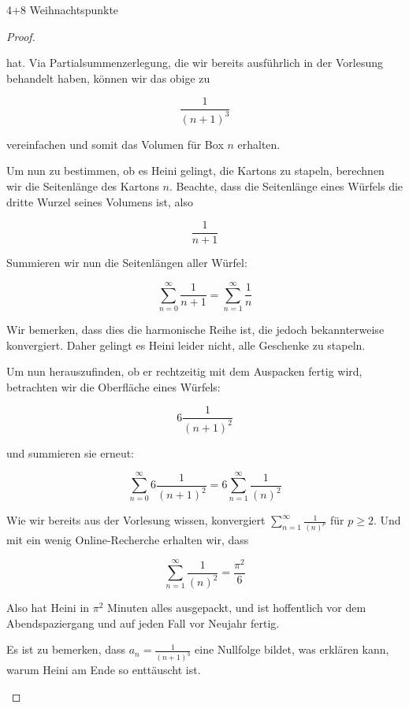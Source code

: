 \documentclass{problemset}
\begin{document}
\begin{problem}[Weihnachtsaufgaben*]{4+8 Weihnachtspunkte}
\begin{proof}
\begin{enumerate}
              hat. Via Partialsummenzerlegung, die wir bereits ausführlich in der Vorlesung
              behandelt haben, können wir das obige zu

              \[
                  \frac{1}{{(n+1)}^3}
              \]

              vereinfachen und somit das Volumen für Box $n$ erhalten.

              Um nun zu bestimmen, ob es Heini gelingt, die Kartons zu stapeln, berechnen wir
              die Seitenlänge des Kartons $n$. Beachte, dass die Seitenlänge eines Würfels
              die dritte Wurzel seines Volumens ist, also

              \[
                  \frac{1}{n+1}
              \]

              Summieren wir nun die Seitenlängen aller Würfel:

              \[
                  \sum_{n=0}^{\infty} \frac{1}{n+1} = \sum_{n=1}^{\infty} \frac{1}{n}
              \]

              Wir bemerken, dass dies die harmonische Reihe ist, die jedoch bekannterweise
              konvergiert. Daher gelingt es Heini leider nicht, alle Geschenke zu stapeln.

              Um nun herauszufinden, ob er rechtzeitig mit dem Auspacken fertig wird,
              betrachten wir die Oberfläche eines Würfels:

              \[
                  6 \frac{1}{{(n+1)}^2}
              \]

              und summieren sie erneut:

              \[
                  \sum_{n=0}^{\infty} 6 \frac{1}{{(n+1)}^2} = 6 \sum_{n=1}^{\infty} \frac{1}{{(n)}^2}
              \]

              Wie wir bereits aus der Vorlesung wissen, konvergiert $\sum_{n=1}^{\infty}
                  \frac{1}{{(n)}^p}$ für $p \ge 2$. Und mit ein wenig Online-Recherche erhalten
              wir, dass

              \[
                  \sum_{n=1}^{\infty} \frac{1}{{(n)}^2} = \frac{\pi^2}{6}
              \]

              Also hat Heini in $\pi^2$ Minuten alles ausgepackt, und ist hoffentlich vor dem
              Abendspaziergang und auf jeden Fall vor Neujahr fertig.

              Es ist zu bemerken, dass $a_n = \frac{1}{{(n+1)}^3}$ eine Nullfolge bildet, was
              erklären kann, warum Heini am Ende so enttäuscht ist.

    \end{enumerate}

\end{proof}
\end{problem}
\end{document}
